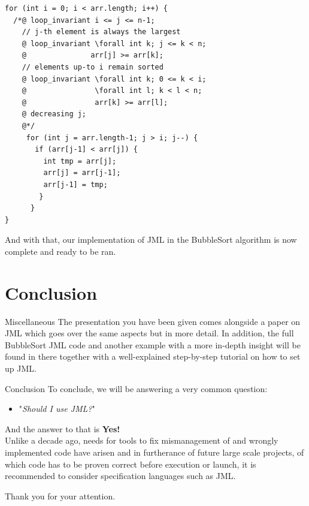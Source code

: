 \documentclass{beamer}
\begin{document}
\begin{frame}[fragile]{}
\begin{lstlisting}[]
for (int i = 0; i < arr.length; i++) {
  /*@ loop_invariant i <= j <= n-1; 
    // j-th element is always the largest
    @ loop_invariant \forall int k; j <= k < n;
    @               arr[j] >= arr[k]; 
    // elements up-to i remain sorted
    @ loop_invariant \forall int k; 0 <= k < i;
    @                \forall int l; k < l < n; 
    @                arr[k] >= arr[l]; 
    @ decreasing j;
    @*/
     for (int j = arr.length-1; j > i; j--) {
       if (arr[j-1] < arr[j]) {
         int tmp = arr[j];
         arr[j] = arr[j-1];
         arr[j-1] = tmp;
        }
      }
}
\end{lstlisting}
\end{frame}

\begin{frame}{}
And with that, our implementation of JML in the BubbleSort algorithm is now complete and ready to be ran.
\end{frame}

\section{Conclusion}

\begin{frame}{Miscellaneous}
    The presentation you have been given comes alongside a paper on JML which goes over the same aspects but in more detail. In addition, the full BubbleSort JML code and another example with a more in-depth insight will be found in there together with a well-explained step-by-step tutorial on how to set up JML.
\end{frame}

\begin{frame}[<+->]{Conclusion}
    To conclude, we will be answering a very common question:\\
    \medskip
    \begin{itemize}
        \item "\textit{Should I use JML?}"
    \end{itemize}
    \smallskip
    And the answer to that is \textbf{Yes!}\\
    \medskip
    Unlike a decade ago, needs for tools to fix mismanagement of and wrongly implemented code have arisen and in furtherance of future large scale projects, of which code has to be proven correct before execution or launch, it is recommended to consider specification languages such as JML.
\end{frame}

\begin{frame}{}
    \begin{center}
        {\Huge Thank you for your attention.}
    \end{center}
\end{frame}
\end{document}
